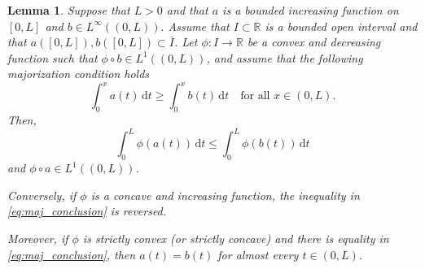 \documentclass[10pt,leqno]{amsart}
\newcommand{\R}[0]{\mathbb{R}}
\newcommand{\dd}{\, \mathrm{d}}
\numberwithin{Theorem}{section}
\newtheorem{Lemma}[Theorem]{Lemma}
\theoremstyle{definition}
\theoremstyle{remark}
\numberwithin{equation}{section}
\numberwithin{equation}{section}
\begin{document}
\begin{Lemma} \label{prop:maj_tool} 
Suppose that $L>0$ and that  $a$ is a bounded increasing function on $[0,L]$ and $b\in L^{\infty}((0,L)).$  Assume that $I \subset \mathbb{R}$ is a bounded open interval and that $a([0,L]), b([0,L]) \subset \overline{I}$. 
Let $\phi:I  \to \R$ be a convex and decreasing function such that  $\phi \circ b \in L^1((0,L))$, and assume that the following majorization condition holds
\begin{equation} \label{eq:maj_assumption}
    \int_0^x a(t) \dd t \ge \int_0^x b(t) \dd t \quad \text{for all } x \in (0, L).
\end{equation}
Then,
\begin{equation} \label{eq:maj_conclusion}
    \int_0^L \phi(a(t)) \dd t \le \int_0^L \phi(b(t)) \dd t 
\end{equation}
and $\phi\circ a\in L^1((0,L))$.

Conversely, if $\phi$ is a concave and increasing function, the inequality in \eqref{eq:maj_conclusion} is reversed.

Moreover, if $\phi$ is strictly convex (or strictly concave) and there is equality in \eqref{eq:maj_conclusion}, then $a(t)=b(t)$ for almost every $t\in(0,L).$
\end{Lemma}
\end{document}

